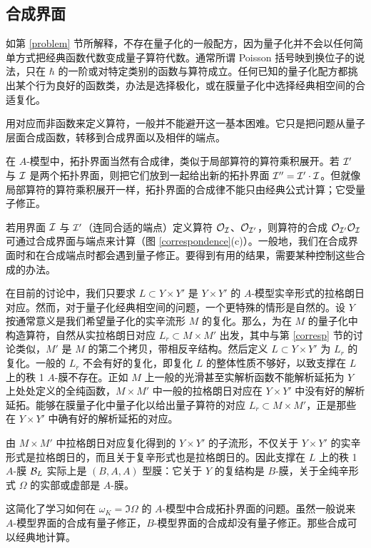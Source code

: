 \subsection{合成界面}\label{composing}

如第 \ref{problem} 节所解释，不存在量子化的一般配方，因为量子化并不会以任何简单方式把经典函数代数变成量子算符代数。通常所谓 Poisson 括号映到换位子的说法，只在 $\hbar$ 的一阶或对特定类别的函数与算符成立。任何已知的量子化配方都挑出某个行为良好的函数类，办法是选择极化，或在膜量子化中选择经典相空间的合适复化。

用对应而非函数来定义算符，一般并不能避开这一基本困难。它只是把问题从量子层面合成函数，转移到合成界面以及相伴的端点。

在 $A$-模型中，拓扑界面当然有合成律，类似于局部算符的算符乘积展开。若 ${\mathcal I}'$ 与 ${\mathcal I}$ 是两个拓扑界面，则把它们放到一起给出新的拓扑界面 ${\mathcal I}''={\mathcal I}'\cdot{\mathcal I}$。但就像局部算符的算符乘积展开一样，拓扑界面的合成律不能只由经典公式计算；它受量子修正。

若用界面 ${\mathcal I}$ 与 ${\mathcal I}'$（连同合适的端点）定义算符 ${\mathcal O}_{\mathcal I}$、${\mathcal O}_{{\mathcal I}'}$，则算符的合成 ${\mathcal O}_{{\mathcal I}'}{\mathcal O}_{\mathcal I}$ 可通过合成界面与端点来计算（图 \ref{correspondence}(c)）。一般地，我们在合成界面时和在合成端点时都会遇到量子修正。要得到有用的结果，需要某种控制这些合成的办法。

在目前的讨论中，我们只要求 $L\subset Y\times Y'$ 是 $Y\times Y'$ 的 $A$-模型实辛形式的拉格朗日对应。然而，对于量子化经典相空间的问题，一个更特殊的情形是自然的。设 $Y$ 按通常意义是我们希望量子化的实辛流形 $M$ 的复化。那么，为在 $M$ 的量子化中构造算符，自然从实拉格朗日对应 $L_r\subset M\times M'$ 出发，其中与第 \ref{corresp} 节的讨论类似，$M'$ 是 $M$ 的第二个拷贝，带相反辛结构。然后定义 $L\subset Y\times Y'$ 为 $L_r$ 的复化。一般的 $L_r$ 不会有好的复化，即复化 $L$ 的整体性质不够好，以致支撑在 $L$ 上的秩 1 $A$-膜不存在。正如 $M$ 上一般的光滑甚至实解析函数不能解析延拓为 $Y$ 上处处定义的全纯函数，$M\times M'$ 中一般的拉格朗日对应在 $Y\times Y'$ 中没有好的解析延拓。能够在膜量子化中量子化以给出量子算符的对应 $L_r\subset M\times M'$，正是那些在 $Y\times Y'$ 中确有好的解析延拓的对应。

由 $M\times M'$ 中拉格朗日对应复化得到的 $Y\times Y'$ 的子流形，不仅关于 $Y\times Y'$ 的实辛形式是拉格朗日的，而且关于复辛形式也是拉格朗日的。因此支撑在 $L$ 上的秩 1 $A$-膜 ${\mathcal B}_L$ 实际上是 $(B,A,A)$ 型膜：它关于 $Y$ 的复结构是 $B$-膜，关于全纯辛形式 $\Omega$ 的实部或虚部是 $A$-膜。

这简化了学习如何在 $\omega_K=\Im\Omega$ 的 $A$-模型中合成拓扑界面的问题。虽然一般说来 $A$-模型界面的合成有量子修正，$B$-模型界面的合成却没有量子修正。那些合成可以经典地计算。


